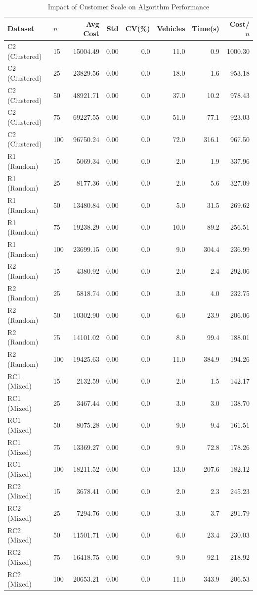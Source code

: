\begin{table}[htbp]
\centering
\caption{Impact of Customer Scale on Algorithm Performance}
\label{tab:customer_scale}
\begin{tabular}{llrrrrrr}
\toprule
Dataset & $n$ & Avg Cost & Std & CV(\%) & Vehicles & Time(s) & Cost/$n$ \\
\midrule
  C2 (Clustered) & 15 & 15004.49 & 0.00 & 0.0 & 11.0 & 0.9 & 1000.30 \\
  C2 (Clustered) & 25 & 23829.56 & 0.00 & 0.0 & 18.0 & 1.6 & 953.18 \\
  C2 (Clustered) & 50 & 48921.71 & 0.00 & 0.0 & 37.0 & 10.2 & 978.43 \\
  C2 (Clustered) & 75 & 69227.55 & 0.00 & 0.0 & 51.0 & 77.1 & 923.03 \\
  C2 (Clustered) & 100 & 96750.24 & 0.00 & 0.0 & 72.0 & 316.1 & 967.50 \\
  R1 (Random) & 15 & 5069.34 & 0.00 & 0.0 & 2.0 & 1.9 & 337.96 \\
  R1 (Random) & 25 & 8177.36 & 0.00 & 0.0 & 2.0 & 5.6 & 327.09 \\
  R1 (Random) & 50 & 13480.84 & 0.00 & 0.0 & 5.0 & 31.5 & 269.62 \\
  R1 (Random) & 75 & 19238.29 & 0.00 & 0.0 & 10.0 & 89.2 & 256.51 \\
  R1 (Random) & 100 & 23699.15 & 0.00 & 0.0 & 9.0 & 304.4 & 236.99 \\
  R2 (Random) & 15 & 4380.92 & 0.00 & 0.0 & 2.0 & 2.4 & 292.06 \\
  R2 (Random) & 25 & 5818.74 & 0.00 & 0.0 & 3.0 & 4.0 & 232.75 \\
  R2 (Random) & 50 & 10302.90 & 0.00 & 0.0 & 6.0 & 23.9 & 206.06 \\
  R2 (Random) & 75 & 14101.02 & 0.00 & 0.0 & 8.0 & 99.4 & 188.01 \\
  R2 (Random) & 100 & 19425.63 & 0.00 & 0.0 & 11.0 & 384.9 & 194.26 \\
  RC1 (Mixed) & 15 & 2132.59 & 0.00 & 0.0 & 2.0 & 1.5 & 142.17 \\
  RC1 (Mixed) & 25 & 3467.44 & 0.00 & 0.0 & 3.0 & 3.0 & 138.70 \\
  RC1 (Mixed) & 50 & 8075.28 & 0.00 & 0.0 & 9.0 & 9.4 & 161.51 \\
  RC1 (Mixed) & 75 & 13369.27 & 0.00 & 0.0 & 9.0 & 72.8 & 178.26 \\
  RC1 (Mixed) & 100 & 18211.52 & 0.00 & 0.0 & 13.0 & 207.6 & 182.12 \\
  RC2 (Mixed) & 15 & 3678.41 & 0.00 & 0.0 & 2.0 & 2.3 & 245.23 \\
  RC2 (Mixed) & 25 & 7294.76 & 0.00 & 0.0 & 3.0 & 3.7 & 291.79 \\
  RC2 (Mixed) & 50 & 11501.71 & 0.00 & 0.0 & 6.0 & 23.4 & 230.03 \\
  RC2 (Mixed) & 75 & 16418.75 & 0.00 & 0.0 & 9.0 & 92.1 & 218.92 \\
  RC2 (Mixed) & 100 & 20653.21 & 0.00 & 0.0 & 11.0 & 343.9 & 206.53 \\
\bottomrule
\end{tabular}
\end{table}